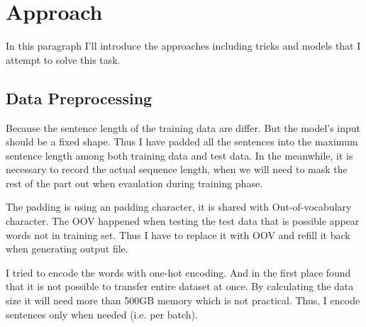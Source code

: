 \section{Approach}
\label{sec:approach}

In this paragraph I'll introduce the approaches including tricks and models that I attempt to solve this task.

\subsection*{Data Preprocessing}

Because the sentence length of the training data are differ. But the model's input should be a fixed shape. Thus I have padded all the sentences into the maximum sentence length among both training data and test data. In the meanwhile, it is necessary to record the actual sequence length, when we will need to mask the rest of the part out when evaulation during training phase.

The padding is using an padding character, it is shared with Out-of-vocabulary character. The OOV happened when testing the test data that is possible appear words not in training set. Thus I have to replace it with OOV and refill it back when generating output file.

I tried to encode the words with one-hot encoding. And in the first place found that it is not possible to transfer entire dataset at once. By calculating the data size it will need more than 500GB memory which is not practical. Thus, I encode sentences only when needed (i.e. per batch).



